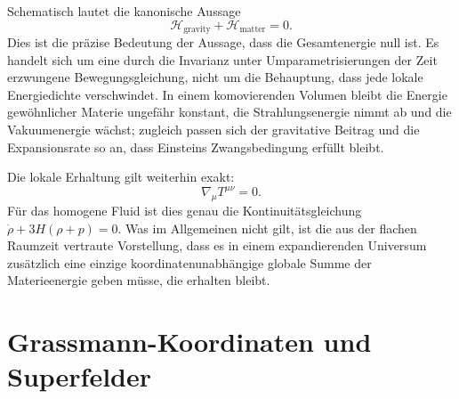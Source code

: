 Schematisch lautet die kanonische Aussage
\begin{equation}
\mathcal H_{\mathrm{gravity}}
+\mathcal H_{\mathrm{matter}}
=0.
\end{equation}
Dies ist die präzise Bedeutung der Aussage, dass die Gesamtenergie null ist. Es handelt sich um eine durch die Invarianz unter Umparametrisierungen der Zeit erzwungene Bewegungsgleichung, nicht um die Behauptung, dass jede lokale Energiedichte verschwindet. In einem komovierenden Volumen bleibt die Energie gewöhnlicher Materie ungefähr konstant, die Strahlungsenergie nimmt ab und die Vakuumenergie wächst; zugleich passen sich der gravitative Beitrag und die Expansionsrate so an, dass Einsteins Zwangsbedingung erfüllt bleibt.

Die lokale Erhaltung gilt weiterhin exakt:
\begin{equation}
\nabla_\mu T^{\mu\nu}=0.
\end{equation}
Für das homogene Fluid ist dies genau die Kontinuitätsgleichung
\(\dot\rho+3H(\rho+p)=0\). Was im Allgemeinen nicht gilt, ist die aus der flachen Raumzeit vertraute Vorstellung, dass es in einem expandierenden Universum zusätzlich eine einzige koordinatenunabhängige globale Summe der Materieenergie geben müsse, die erhalten bleibt.

\begin{classroomqa}
\end{classroomqa}

\section{Grassmann-Koordinaten und Superfelder}

\begin{classroomqa}
\end{classroomqa}

